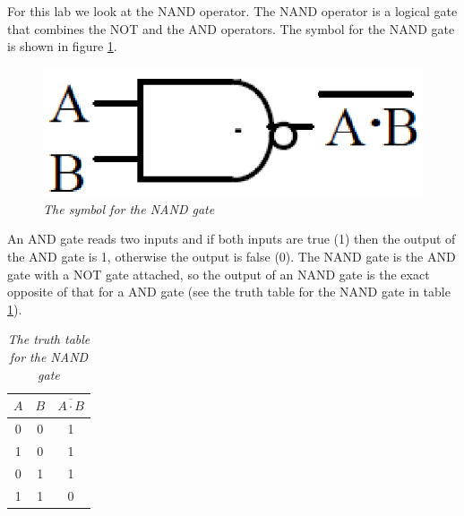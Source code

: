 \documentclass[11pt]{article}
\numberwithin{equation}{section}
\numberwithin{figure}{section}
\numberwithin{table}{section}
\begin{document}
For this lab we look at the NAND operator. The NAND operator is a logical gate that combines the NOT and the AND operators. The symbol for the NAND gate is shown in figure \ref{FigNAND}.
\begin{figure}[h]
\centering
\includegraphics[scale=0.50]{FigNAND.eps}
\caption{\textit{The symbol for the NAND gate}}
\label{FigNAND}
\end{figure}
An AND gate reads two inputs and if both inputs are true (1) then the output of the AND gate is 1, otherwise the output is false (0). The NAND gate is the AND gate with a NOT gate attached, so the output of an NAND gate is the exact opposite of that for a AND gate (see the truth table for the NAND gate in table \ref{TruthTabNAND}).
\begin{table}[h]
\centering
\begin{tabular}{cc|c}
$A$	&$B$	&$\overline{A\cdot B}$\\
\hline
0	&0	&1\\
1	&0	&1\\
0	&1	&1\\
1	&1	&0\\
\end{tabular}
\caption{\textit{The truth table for the NAND gate}}
\label{TruthTabNAND}
\end{table}
\end{document}
